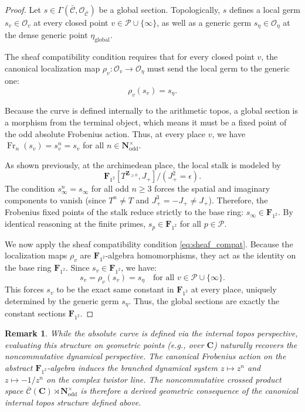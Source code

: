 \documentclass[11pt,a4paper]{article}
\let\mathscr\mathscr
\newtheorem{remark}[theorem]{Remark}
\newcommand{\C}{\mathbf{C}}
\newcommand{\N}{\mathbf{N}}
\newcommand{\Z}{\mathbf{Z}}
\newcommand{\Ftwo}{\mathbf{F}_{1^2}}
\newcommand{\frob}{{\operatorname{Fr}}}
\begin{document}
\begin{proof}
Let $s \in \Gamma(\bar{\mathscr{C}}, \mathcal{O}_{\bar{\mathscr{C}}})$ be a global section. Topologically, $s$ defines a local germ $s_v \in \mathcal{O}_v$ at every closed point $v \in \mathcal{P} \cup \{\infty\}$, as well as a generic germ $s_\eta \in \mathcal{O}_\eta$ at the dense generic point $\eta_{\text{global}}$. 

The sheaf compatibility condition requires that for every closed point $v$, the canonical localization map $\rho_v: \mathcal{O}_v \to \mathcal{O}_\eta$ must send the local germ to the generic one:
\begin{equation}\label{eq:sheaf_compat}
\rho_v(s_v) = s_\eta.
\end{equation}

Because the curve is defined internally to the arithmetic topos, a global section is a morphism from the terminal object, which means it must be a fixed point of the odd absolute Frobenius action. Thus, at every place $v$, we  have $\frob_n(s_v) = s_v^n = s_v$ for all $n \in \N^\times_{\text{odd}}$.

As shown previously, at the archimedean place, the local stalk is modeled by $$\Ftwo[T^{\Z_{\geq 0}}, J_+] / (J_+^2 = \epsilon).$$ The condition $s_\infty^n = s_\infty$ for all odd $n \geq 3$ forces the spatial and imaginary components to vanish (since $T^n \neq T$ and $J_+^3 = -J_+ \neq J_+$). Therefore, the Frobenius fixed points of the stalk reduce strictly to the base ring: $s_\infty \in \Ftwo$. By identical reasoning at the finite primes, $s_p \in \Ftwo$ for all $p \in \mathcal{P}$.

We now apply the sheaf compatibility condition \eqref{eq:sheaf_compat}. Because the localization maps $\rho_v$ are $\Ftwo$-algebra homomorphisms, they act as the identity on the base ring $\Ftwo$. Since $s_v \in \Ftwo$, we have:
\begin{equation*}
s_v = \rho_v(s_v) = s_\eta \quad \text{for all } v \in \mathcal{P} \cup \{\infty\}.
\end{equation*}
This forces $s_v$ to be the exact same constant in $\Ftwo$ at every place, uniquely determined by the generic germ $s_\eta$. Thus, the global sections are exactly the constant sections $\Ftwo$.
\end{proof}

\begin{remark}
While the absolute curve is defined via the internal topos perspective, evaluating this structure on geometric points (e.g., over $\C$) naturally recovers the noncommutative dynamical perspective. The canonical Frobenius action on the abstract $\Ftwo$-algebra induces the branched dynamical system $z \mapsto z^n$ and $z \mapsto -1/z^n$ on the complex twistor line. The noncommutative crossed product space $\bar{\mathscr{C}}(\C) \rtimes \N^\times_{\text{odd}}$ is therefore a derived geometric consequence of the canonical internal topos structure defined above.
\end{remark}
\end{document}
